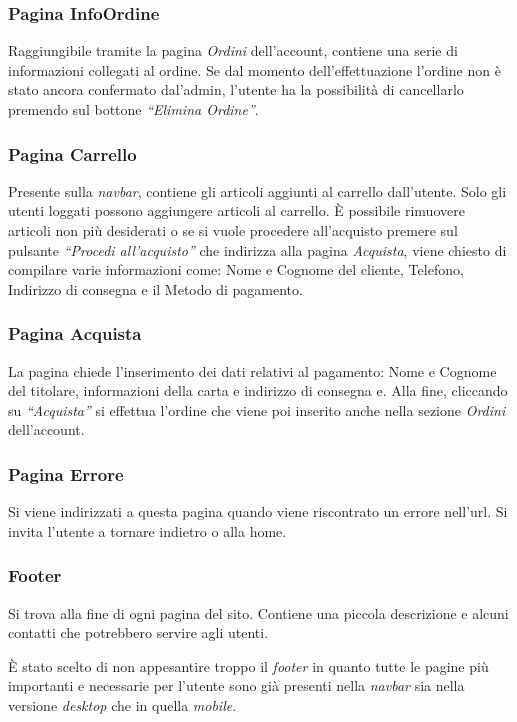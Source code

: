 \subsubsection{Pagina InfoOrdine}
Raggiungibile tramite la pagina \textit{Ordini} dell'account, contiene una serie di informazioni collegati al ordine. Se dal momento dell’effettuazione l’ordine non è stato ancora confermato dal’admin, l’utente ha la possibilità di cancellarlo premendo sul bottone \textit{“Elimina Ordine”}.

\subsubsection{Pagina Carrello}
Presente sulla \textit{navbar}, contiene gli articoli aggiunti al carrello dall’utente. Solo gli utenti loggati possono aggiungere articoli al carrello. È possibile rimuovere articoli non più desiderati o se si vuole procedere all'acquisto premere sul pulsante \textit{“Procedi all’acquisto”} che indirizza alla pagina \textit{Acquista}, viene chiesto di compilare varie informazioni come: Nome e Cognome del cliente, Telefono, Indirizzo di consegna e il Metodo di pagamento.

\subsubsection{Pagina Acquista}
La pagina chiede l’inserimento dei dati relativi al pagamento: Nome e Cognome del titolare, informazioni della carta e indirizzo di consegna e. Alla fine, cliccando su \textit{“Acquista”} si effettua l’ordine che viene poi inserito anche nella sezione \textit{Ordini} dell’account.

\subsubsection{Pagina Errore}
Si viene indirizzati a questa pagina quando viene riscontrato un errore nell’url. Si invita l’utente a tornare indietro o alla home.

\subsubsection{Footer}
Si trova alla fine di ogni pagina del sito. Contiene una piccola descrizione e alcuni contatti che potrebbero servire agli utenti.

È stato scelto di non appesantire troppo il \textit{footer} in quanto tutte le pagine più importanti e necessarie per l’utente sono già presenti nella \textit{navbar} sia nella versione \textit{desktop} che in quella \textit{mobile}.

	
	
	
	